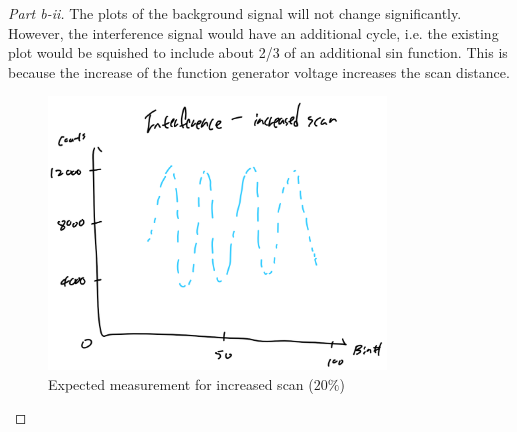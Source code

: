 \documentclass{article}
\numberwithin{equation}{section}
\begin{document}
\begin{proof}
    [Part b-ii] 
    The plots of the background signal will not change 
    significantly. However, the interference signal would have 
    an additional cycle, i.e. the existing plot would be squished 
    to include about 2/3 of an additional sin function. This is 
    because the increase of the function generator voltage 
    increases the scan distance.  
    \begin{figure}[htp]
        \centering
        \includegraphics[width=0.8\textwidth]{B_spread.png} %
        \caption{Expected measurement for increased scan ($20\%$)}
        \label{fig:Bspread}
    \end{figure}
\end{proof}
\end{document}
